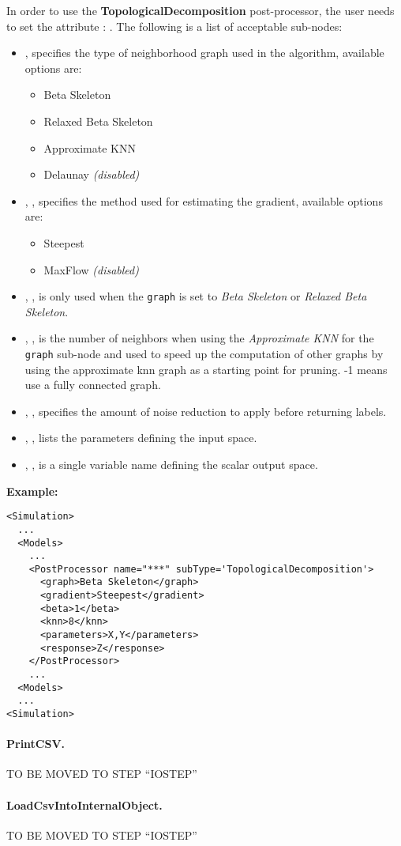 In order to use the \textbf{TopologicalDecomposition} post-processor, the user
needs to set the attribute : 
. 
The following is a list of acceptable sub-nodes:
\begin{itemize}
  \item {} , specifies the type
  of neighborhood graph used in the algorithm, available options are:
  \begin{itemize}
    \item Beta Skeleton
    \item Relaxed Beta Skeleton
    \item Approximate KNN
    \item Delaunay \textit{(disabled)}
  \end{itemize}
  \item {}, , specifies the 
  method used for estimating the gradient, available options are:
  \begin{itemize}
    \item Steepest
    \item MaxFlow \textit{(disabled)}
  \end{itemize}
  \item {}, , is only used when the
  \texttt{graph} is set to \textit{Beta Skeleton} or \textit{Relaxed Beta
  Skeleton}.
  \item {}, , is the number of
  neighbors when using the \textit{Approximate KNN} for the \texttt{graph}
  sub-node and used to speed up the computation of other graphs by using the
  approximate knn graph as a starting point for pruning. -1 means use a fully
  connected graph.
  \item {}, , specifies the
  amount of noise reduction to apply before returning labels. 
  \item {}, ,
  lists the parameters defining the input space.
  \item {}, , is a single
  variable name defining the scalar output space.
\end{itemize}
\textbf{Example:}
\begin{lstlisting}[style=XML,morekeywords={subType}]
<Simulation>
  ...
  <Models>
    ...
    <PostProcessor name="***" subType='TopologicalDecomposition'>
      <graph>Beta Skeleton</graph>
      <gradient>Steepest</gradient>
      <beta>1</beta>
      <knn>8</knn>
      <parameters>X,Y</parameters>
      <response>Z</response>
    </PostProcessor>
    ...
  <Models>
  ...
<Simulation>
\end{lstlisting}
\paragraph{PrintCSV.}
\label{PrintCSV}
TO BE MOVED TO STEP ``IOSTEP''
\paragraph{LoadCsvIntoInternalObject.}
\label{LoadCsvIntoInternalObject}
TO BE MOVED TO STEP ``IOSTEP''

